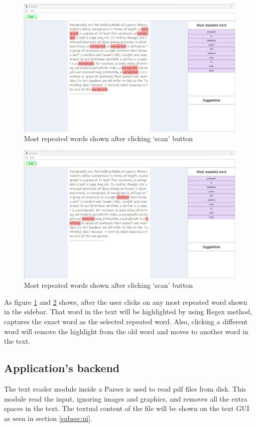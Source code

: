 \documentclass[12pt,oneside,openright,a4paper]{cpe-english-project}
\begin{document}
\begin{figure}[!h]\centering
\includegraphics[width=15cm]{./img/chp4/highlight1.png}
\caption{Most repeated words shown after clicking ‘scan’ button}\label{fig:ui5}
\end{figure}
\begin{figure}[!h]\centering
\includegraphics[width=15cm]{./img/chp4/highlight2.png}
\caption{Most repeated words shown after clicking ‘scan’ button}\label{fig:ui6}
\end{figure}

As figure \ref{fig:ui5} and \ref{fig:ui6} shows, after the user clicks on any most repeated word shown in the sidebar. That word in the text will be highlighted by using Regex method, captures the exact word as the selected repeated word. Also, clicking a different word will remove the highlight from the old word and moves to another word in the text.

\subsection{Application's backend}
The text reader module inside a Parser is used to read pdf files from disk. This module read the input, ignoring images and graphics, and removes all the extra spaces in the text. The textual content of the file will be shown on the text GUI as seen in section \ref{subsec:ui}. 
\end{document}
